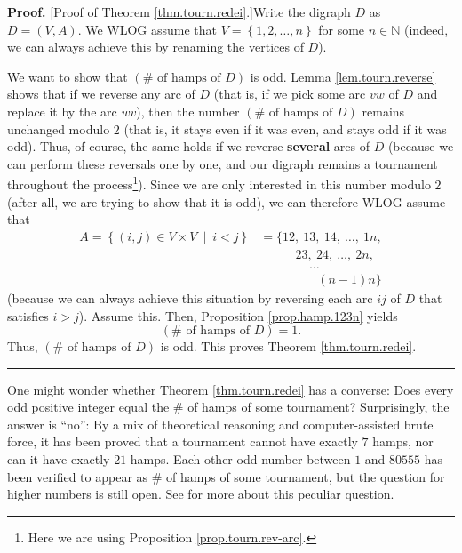 \documentclass[numbers=enddot,12pt,final,onecolumn,notitlepage]{scrartcl}%
\numberwithin{exer}{subsection}
\theoremstyle{definition}
\newenvironment{proof}[1][Proof]{\noindent\textbf{#1.} }{\ \rule{0.5em}{0.5em}}
\begin{document}
\begin{proof}
[Proof of Theorem \ref{thm.tourn.redei}.]Write the digraph $D$ as $D=\left(
V,A\right)  $. We WLOG assume that $V=\left\{  1,2,\ldots,n\right\}  $ for
some $n\in\mathbb{N}$ (indeed, we can always achieve this by renaming the
vertices of $D$).

We want to show that $\left(  \#\text{ of hamps of }D\right)  $ is odd. Lemma
\ref{lem.tourn.reverse} shows that if we reverse any arc of $D$ (that is, if
we pick some arc $vw$ of $D$ and replace it by the arc $wv$), then the number
$\left(  \#\text{ of hamps of }D\right)  $ remains unchanged modulo $2$ (that
is, it stays even if it was even, and stays odd if it was odd). Thus, of
course, the same holds if we reverse \textbf{several} arcs of $D$ (because we
can perform these reversals one by one, and our digraph remains a tournament
throughout the process\footnote{Here we are using Proposition
\ref{prop.tourn.rev-arc}.}). Since we are only interested in this number
modulo $2$ (after all, we are trying to show that it is odd), we can therefore
WLOG assume that%
\begin{align*}
A=\left\{  \left(  i,j\right)  \in V\times V\ \mid\ i<j\right\}   &
=\{12,\ 13,\ 14,\ \ldots,\ 1n,\\
&  \ \ \ \ \ \ \ \ \ \ \ \ \ 23,\ 24,\ \ldots,\ 2n,\\
&  \ \ \ \ \ \ \ \ \ \ \ \ \ \ \ \ \ \ \ldots\\
&  \ \ \ \ \ \ \ \ \ \ \ \ \ \ \ \ \ \ \ \ \ \left(  n-1\right)  n\}
\end{align*}
(because we can always achieve this situation by reversing each arc $ij$ of
$D$ that satisfies $i>j$). Assume this. Then, Proposition \ref{prop.hamp.123n}
yields%
\[
\left(  \#\text{ of hamps of }D\right)  =1.
\]
Thus, $\left(  \#\text{ of hamps of }D\right)  $ is odd. This proves Theorem
\ref{thm.tourn.redei}.
\end{proof}

One might wonder whether Theorem \ref{thm.tourn.redei} has a converse: Does
every odd positive integer equal the $\#$ of hamps of some tournament?
Surprisingly, the answer is \textquotedblleft no\textquotedblright: By a mix
of theoretical reasoning and computer-assisted brute force, it has been proved
that a tournament cannot have exactly $7$ hamps, nor can it have exactly $21$
hamps. Each other odd number between $1$ and $80555$ has been verified to
appear as $\#$ of hamps of some tournament, but the question for higher
numbers is still open. See \cite{MO232751} for more about this peculiar question.
\end{document}
